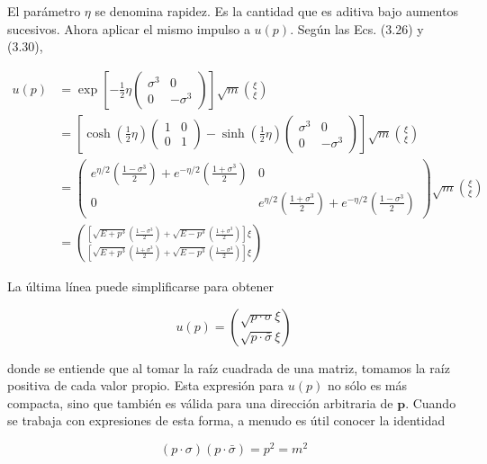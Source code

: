 El parámetro $\eta$ se denomina rapidez. Es la cantidad que es aditiva bajo aumentos sucesivos. Ahora aplicar el mismo impulso a $u(p)$. Según las Ecs. (3.26) y (3.30),

\begin{align*}
u(p) & =\exp \left[-\frac{1}{2} \eta\left(\begin{array}{cc}
\sigma^{3} & 0 \\
0 & -\sigma^{3}
\end{array}\right)\right] \sqrt{m}\binom{\xi}{\xi} \\
& =\left[\cosh \left(\frac{1}{2} \eta\right)\left(\begin{array}{ll}
1 & 0 \\
0 & 1
\end{array}\right)-\sinh \left(\frac{1}{2} \eta\right)\left(\begin{array}{cc}
\sigma^{3} & 0 \\
0 & -\sigma^{3}
\end{array}\right)\right] \sqrt{m}\binom{\xi}{\xi} \\
& =\left(\begin{array}{cc}
e^{\eta / 2}\left(\frac{1-\sigma^{3}}{2}\right)+e^{-\eta / 2}\left(\frac{1+\sigma^{3}}{2}\right) & 0 \\
0 & e^{\eta / 2}\left(\frac{1+\sigma^{3}}{2}\right)+e^{-\eta / 2}\left(\frac{1-\sigma^{3}}{2}\right)
\end{array}\right) \sqrt{m}\binom{\xi}{\xi} \\
& =\binom{\left[\sqrt{E+p^{3}}\left(\frac{1-\sigma^{3}}{2}\right)+\sqrt{E-p^{3}}\left(\frac{1+\sigma^{3}}{2}\right)\right] \xi}{\left[\sqrt{E+p^{3}}\left(\frac{1+\sigma^{3}}{2}\right)+\sqrt{E-p^{3}}\left(\frac{1-\sigma^{3}}{2}\right)\right] \xi} \tag{3.49}
\end{align*}


La última línea puede simplificarse para obtener

\begin{equation*}
u(p)=\binom{\sqrt{p \cdot \sigma} \xi}{\sqrt{p \cdot \bar{\sigma}} \xi} \tag{3.50}
\end{equation*}

donde se entiende que al tomar la raíz cuadrada de una matriz, tomamos la raíz positiva de cada valor propio. Esta expresión para $u(p)$ no sólo es más compacta, sino que también es válida para una dirección arbitraria de $\mathbf{p}$. Cuando se trabaja con expresiones de esta forma, a menudo es útil conocer la identidad

\begin{equation*}
(p \cdot \sigma)(p \cdot \bar{\sigma})=p^{2}=m^{2} \tag{3.51}
\end{equation*}


